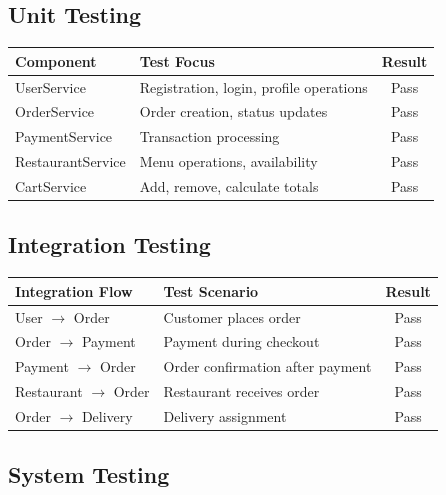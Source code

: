 \documentclass[12pt,a4paper]{report}
\begin{document}
\subsection{Unit Testing}

\begin{longtable}{|p{3cm}|p{7cm}|c|}
\hline
\textbf{Component} & \textbf{Test Focus} & \textbf{Result} \\
\hline
\endfirsthead
UserService & Registration, login, profile operations & Pass \\
\hline
OrderService & Order creation, status updates & Pass \\
\hline
PaymentService & Transaction processing & Pass \\
\hline
RestaurantService & Menu operations, availability & Pass \\
\hline
CartService & Add, remove, calculate totals & Pass \\
\hline
\end{longtable}

\subsection{Integration Testing}

\begin{longtable}{|p{3cm}|p{7cm}|c|}
\hline
\textbf{Integration Flow} & \textbf{Test Scenario} & \textbf{Result} \\
\hline
\endfirsthead
User $\rightarrow$ Order & Customer places order & Pass \\
\hline
Order $\rightarrow$ Payment & Payment during checkout & Pass \\
\hline
Payment $\rightarrow$ Order & Order confirmation after payment & Pass \\
\hline
Restaurant $\rightarrow$ Order & Restaurant receives order & Pass \\
\hline
Order $\rightarrow$ Delivery & Delivery assignment & Pass \\
\hline
\end{longtable}

\subsection{System Testing}
\end{document}
